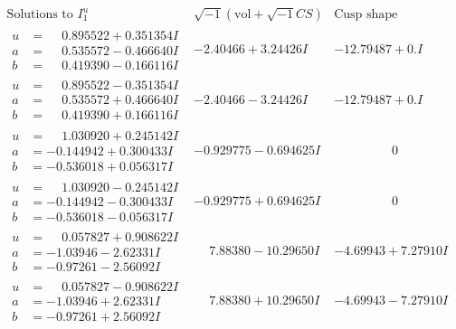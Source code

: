 \documentclass[1p]{elsarticle_modified}
\theoremstyle{definition}
\newcommand{\I}{\sqrt{-1}}
\begin{document}
$$\begin{array}{c|c|c}  
\text{Solutions to }I^u_{1}& \I (\text{vol} + \sqrt{-1}CS) & \text{Cusp shape}\\
 \hline 
\begin{aligned}
u &= \phantom{-}0.895522 + 0.351354 I \\
a &= \phantom{-}0.535572 - 0.466640 I \\
b &= \phantom{-}0.419390 - 0.166116 I\end{aligned}
 & -2.40466 + 3.24426 I & -12.79487 + 0. I\phantom{ +0.000000I} \\ \hline\begin{aligned}
u &= \phantom{-}0.895522 - 0.351354 I \\
a &= \phantom{-}0.535572 + 0.466640 I \\
b &= \phantom{-}0.419390 + 0.166116 I\end{aligned}
 & -2.40466 - 3.24426 I & -12.79487 + 0. I\phantom{ +0.000000I} \\ \hline\begin{aligned}
u &= \phantom{-}1.030920 + 0.245142 I \\
a &= -0.144942 + 0.300433 I \\
b &= -0.536018 + 0.056317 I\end{aligned}
 & -0.929775 - 0.694625 I & \phantom{-0.000000 } 0 \\ \hline\begin{aligned}
u &= \phantom{-}1.030920 - 0.245142 I \\
a &= -0.144942 - 0.300433 I \\
b &= -0.536018 - 0.056317 I\end{aligned}
 & -0.929775 + 0.694625 I & \phantom{-0.000000 } 0 \\ \hline\begin{aligned}
u &= \phantom{-}0.057827 + 0.908622 I \\
a &= -1.03946 - 2.62331 I \\
b &= -0.97261 - 2.56092 I\end{aligned}
 & \phantom{-}7.88380 - 10.29650 I & -4.69943 + 7.27910 I \\ \hline\begin{aligned}
u &= \phantom{-}0.057827 - 0.908622 I \\
a &= -1.03946 + 2.62331 I \\
b &= -0.97261 + 2.56092 I\end{aligned}
 & \phantom{-}7.88380 + 10.29650 I & -4.69943 - 7.27910 I \\ \hline\begin{aligned}

\end{aligned}
\end{array}$$
\end{document}
